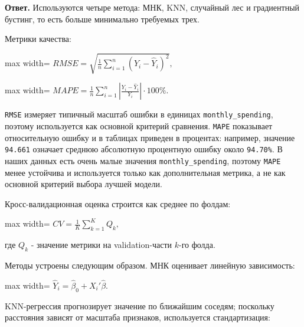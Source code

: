 \documentclass[11pt]{article}
\begin{document}
\textbf{Ответ.} Используются четыре метода: МНК, KNN, случайный лес и
градиентный бустинг, то есть больше минимально требуемых трех.

Метрики качества:

\begin{center}
\begin{adjustbox}{max width=\linewidth}
\(\displaystyle RMSE = \sqrt{\frac{1}{n}\sum_{i=1}^{n}(Y_i - \hat Y_i)^2},\)
\end{adjustbox}
\end{center}

\begin{center}
\begin{adjustbox}{max width=\linewidth}
\(\displaystyle MAPE = \frac{1}{n}\sum_{i=1}^{n}\left|\frac{Y_i - \hat Y_i}{Y_i}\right| \cdot 100\%.\)
\end{adjustbox}
\end{center}

\texttt{RMSE} измеряет типичный масштаб ошибки в единицах
\texttt{monthly\_spending}, поэтому используется как основной критерий
сравнения. \texttt{MAPE} показывает относительную ошибку и в таблицах
приведен в процентах: например, значение \texttt{94.661} означает
среднюю абсолютную процентную ошибку около \texttt{94.70\%}. В наших
данных есть очень малые значения \texttt{monthly\_spending}, поэтому
\texttt{MAPE} менее устойчива и используется только как дополнительная
метрика, а не как основной критерий выбора лучшей модели.

Кросс-валидационная оценка строится как среднее по фолдам:

\begin{center}
\begin{adjustbox}{max width=\linewidth}
\(\displaystyle CV = \frac{1}{K}\sum_{k=1}^{K}Q_k,\)
\end{adjustbox}
\end{center}

где \(Q_k\) - значение метрики на validation-части \(k\)-го фолда.

Методы устроены следующим образом. МНК оценивает линейную зависимость:

\begin{center}
\begin{adjustbox}{max width=\linewidth}
\(\displaystyle \hat Y_i = \hat\beta_0 + X_i'\hat\beta.\)
\end{adjustbox}
\end{center}

KNN-регрессия прогнозирует значение по ближайшим соседям; поскольку
расстояния зависят от масштаба признаков, используется стандартизация:
\end{document}
